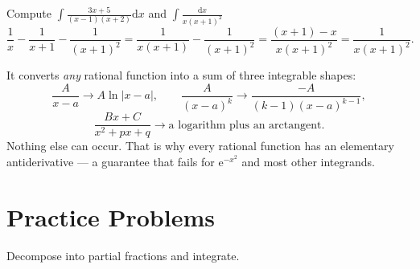 \begin{worked}{Compute $\displaystyle\int\frac{3x+5}{(x-1)(x+2)}\mathrm{d}x$ and $\displaystyle\int\frac{\mathrm{d}x}{x(x+1)^{2}}$}
\[
  \frac{1}{x}-\frac{1}{x+1}-\frac{1}{(x+1)^{2}}
  =\frac{1}{x(x+1)}-\frac{1}{(x+1)^{2}}
  =\frac{(x+1)-x}{x(x+1)^{2}}
  =\frac{1}{x(x+1)^{2}} .
\]
\checkmark

It converts \emph{any} rational function into a sum of three integrable
shapes:
\[
  \frac{A}{x-a}\to A\ln|x-a|,
  \qquad
  \frac{A}{(x-a)^{k}}\to\frac{-A}{(k-1)(x-a)^{k-1}},
\]
\[
  \frac{Bx+C}{x^{2}+px+q}\to\text{a logarithm plus an arctangent} .
\]
Nothing else can occur. That is why every rational function has an
elementary antiderivative --- a guarantee that fails for
$\mathrm{e}^{-x^{2}}$ and most other integrands.
\end{worked}

\section{Practice Problems}

Decompose into partial fractions and integrate.

